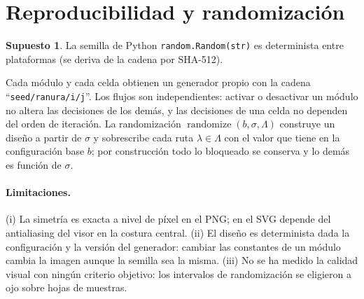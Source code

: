 \documentclass[11pt,a4paper]{article}
\theoremstyle{definition}
\newtheorem{supuesto}{Supuesto}[section]
\theoremstyle{plain}
\theoremstyle{remark}
\begin{document}
\section{Reproducibilidad y randomización}
\begin{supuesto}
La semilla de Python \texttt{random.Random(str)} es determinista entre plataformas
(se deriva de la cadena por SHA-512).
\end{supuesto}
Cada módulo y cada celda obtienen un generador propio con la cadena
``\texttt{seed/\allowbreak ranura/\allowbreak i/\allowbreak j}''. Los flujos son independientes: activar o desactivar
un módulo no altera las decisiones de los demás, y las decisiones de una celda no
dependen del orden de iteración. La randomización $\operatorname{randomize}(b,\sigma,\Lambda)$
construye un diseño a partir de $\sigma$ y sobrescribe cada ruta $\lambda\in\Lambda$
con el valor que tiene en la configuración base $b$; por construcción todo lo
bloqueado se conserva y lo demás es función de $\sigma$.

\paragraph{Limitaciones.} (i) La simetría es exacta a nivel de píxel en el PNG; en el
SVG depende del antialiasing del visor en la costura central. (ii) El diseño es
determinista dada la configuración y la versión del generador: cambiar
las constantes de un módulo cambia la imagen aunque la semilla sea la misma.
(iii) No se ha medido la calidad visual con ningún criterio objetivo: los
intervalos de randomización se eligieron a ojo sobre hojas de muestras.
\end{document}
